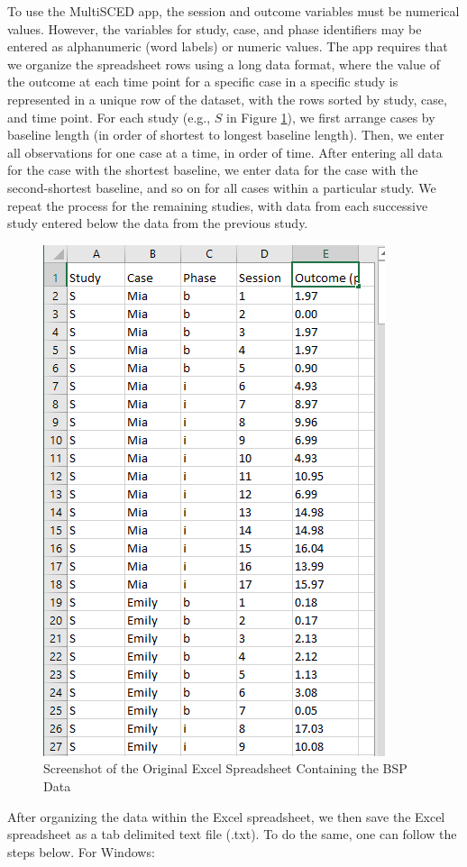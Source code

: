 \documentclass[
]{book}
\begin{document}
To use the MultiSCED app, the session and outcome variables must be numerical values. However, the variables for study, case, and phase identifiers may be entered as alphanumeric (word labels) or numeric values. The app requires that we organize the spreadsheet rows using a long data format, where the value of the outcome at each time point for a specific case in a specific study is represented in a unique row of the dataset, with the rows sorted by study, case, and time point. For each study (e.g., \(S\) in Figure \ref{fig:Excel-BSP}), we first arrange cases by baseline length (in order of shortest to longest baseline length). Then, we enter all observations for one case at a time, in order of time. After entering all data for the case with the shortest baseline, we enter data for the case with the second-shortest baseline, and so on for all cases within a particular study. We repeat the process for the remaining studies, with data from each successive study entered below the data from the previous study.

\begin{figure}
\includegraphics[width=0.6\linewidth]{images/excel_BSP} \caption{Screenshot of the Original Excel Spreadsheet Containing the BSP Data}\label{fig:Excel-BSP}
\end{figure}

After organizing the data within the Excel spreadsheet, we then save the Excel spreadsheet as a tab delimited text file (.txt). To do the same, one can follow the steps below.
For Windows:
\end{document}
